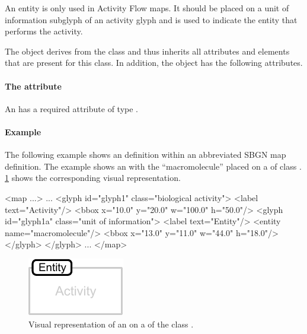 An entity is only used in Activity Flow maps. It should be placed on a unit of information subglyph of an activity glyph and is used to indicate the entity that performs the activity.

The \Entity object derives from the \SbgnBase class and thus inherits all
attributes and elements that are present for this class.
In addition, the \Entity object has the following attributes.

\paragraph{The \fixttspace{} attribute}

An \Entity has a required attribute  of type
. %

\paragraph{Example}

The following example shows an \Entity definition within an abbreviated SBGN map definition. The example shows an \Entity with the  ``macromolecule'' placed on a \Glyph of class . \ref{fig:entity_example} shows the corresponding visual representation.

\begin{example}
<map ...>
    ...
    <glyph id="glyph1" class="biological activity">
        <label text="Activity"/>
        <bbox x="10.0" y="20.0" w="100.0" h="50.0"/>
        <glyph id="glyph1a" class="unit of information">
            <label text="Entity"/>
            <entity name="macromolecule"/>
            <bbox x="13.0" y="11.0" w="44.0" h="18.0"/>
        </glyph>
    </glyph>
    ...
</map>
\end{example}

\begin{figure}[!ht]
  \centering
  \includegraphics[scale=0.9]{figures/entity_example.pdf}
\caption{Visual representation of an \Entity on a \Glyph of the class .}
  \label{fig:entity_example}
\end{figure}


